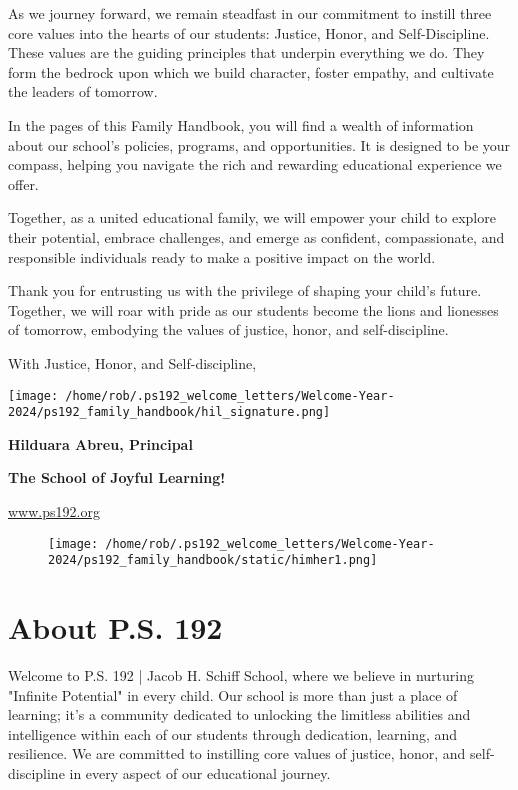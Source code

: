 \documentclass[11pt]{article}
\begin{document}
As we journey forward, we remain steadfast in our commitment to instill three core values into the hearts of our students: Justice, Honor, and Self-Discipline. These values are the guiding principles that underpin everything we do. They form the bedrock upon which we build character, foster empathy, and cultivate the leaders of tomorrow.

In the pages of this Family Handbook, you will find a wealth of information about our school’s policies, programs, and opportunities. It is designed to be your compass, helping you navigate the rich and rewarding educational experience we offer.

Together, as a united educational family, we will empower your child to explore their potential, embrace challenges, and emerge as confident, compassionate, and responsible individuals ready to make a positive impact on the world.

Thank you for entrusting us with the privilege of shaping your child’s future. Together, we will roar with pride as our students become the lions and lionesses of tomorrow, embodying the values of justice, honor, and self-discipline.

With Justice, Honor, and Self-discipline,

\texttt{[image: /home/rob/.ps192\_welcome\_letters/Welcome-Year-2024/ps192\_family\_handbook/hil\_signature.png]}

\textbf{\textbf{Hilduara Abreu, Principal}}

\textbf{\textbf{The School of Joyful Learning!}}

\href{https://www.ps192.org}{www.ps192.org}

\begin{figure}[b]  %
  \centering
  \texttt{[image: /home/rob/.ps192\_welcome\_letters/Welcome-Year-2024/ps192\_family\_handbook/static/himher1.png]}
  \label{fig:fronpage bottom_image}
\end{figure}

\clearpage

\section{About P.S. 192}
\label{sec:orgceb890f}

Welcome to P.S. 192 | Jacob H. Schiff School, where we believe in nurturing "Infinite Potential" in every child. Our school is more than just a place of learning; it’s a community dedicated to unlocking the limitless abilities and intelligence within each of our students through dedication, learning, and resilience. We are committed to instilling core values of justice, honor, and self-discipline in every aspect of our educational journey.
\end{document}
